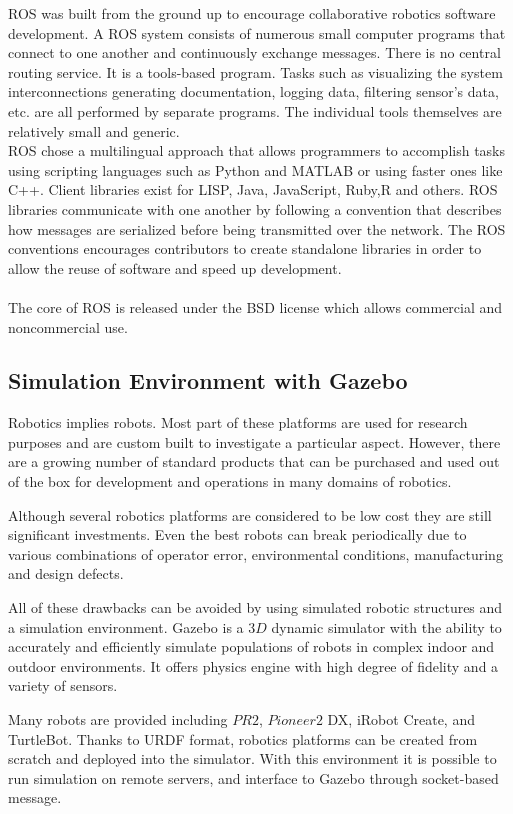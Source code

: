 ROS was built from the ground up to encourage collaborative robotics software development. A ROS system consists of numerous small computer programs that connect to one another and continuously exchange messages. There is no central routing service. It is a tools-based program. Tasks such as visualizing the system interconnections generating documentation, logging data, filtering sensor's data, etc. are all performed by separate programs. The individual tools themselves are relatively small and generic.
\\
ROS chose a multilingual approach that allows programmers to accomplish tasks using scripting languages such as Python and MATLAB or using faster ones like C++. Client libraries exist for LISP, Java, JavaScript, Ruby,R and others. ROS libraries communicate with one another by following a convention that describes how messages are serialized before being transmitted over the network. The ROS conventions encourages contributors to create standalone libraries in order to allow the reuse of software and speed up development.\\
\\
The core of ROS is released under the BSD license which allows commercial and noncommercial use.

\subsection{Simulation Environment with Gazebo}

Robotics implies robots. Most part of these platforms are used for research purposes and are custom built to investigate a particular aspect. However, there are a growing number of standard products that can be purchased and used out of the box for development and operations in many domains of robotics.

Although several robotics platforms are considered to be low cost they are still significant investments. Even the best robots can break periodically due to various combinations of operator error, environmental conditions, manufacturing and design defects.

All of these drawbacks can be avoided by using simulated robotic structures and a simulation environment. Gazebo is a $3D$ dynamic simulator with the ability to accurately and efficiently simulate populations of robots in complex indoor and outdoor environments. It offers physics engine with high degree of fidelity and a variety of sensors.

Many robots are provided including $PR2$, $Pioneer2$ DX, iRobot Create, and TurtleBot. Thanks to URDF format, robotics platforms can be created from scratch and deployed into the simulator.
With this environment it is possible to run simulation on remote servers, and interface to Gazebo through socket-based message.

